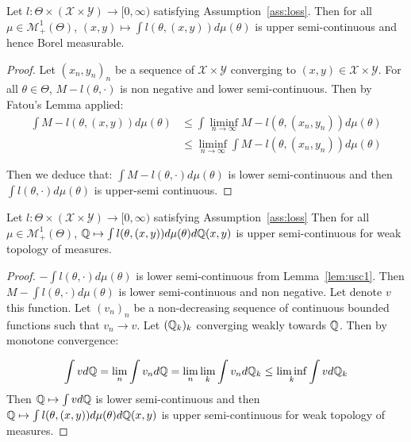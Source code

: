 \begin{lemma}
\label{lem:usc1}
Let $l:\Theta\times(\mathcal{X}\times\mathcal{Y})\rightarrow [0,\infty)$ satisfying Assumption~\ref{ass:loss}.
Then for all $\mu\in\mathcal{M}^1_+(\Theta)$, $(x,y)\mapsto\int l(\theta,(x,y))d\mu(\theta)$ is upper semi-continuous and hence Borel measurable.  
\end{lemma}
\begin{proof}
Let $(x_n,y_n)_n$ be a sequence of $\mathcal{X}\times\mathcal{Y}$ converging to $(x,y)\in\mathcal{X}\times\mathcal{Y}$.  For all $\theta\in\Theta$, $M-l(\theta,\cdot)$ is non negative and lower semi-continuous. Then by Fatou's Lemma applied:
\begin{align*}
   \int M-l(\theta,(x,y))d\mu(\theta)&\leq\int \liminf_{n\to\infty}  M-l(\theta,(x_n,y_n))d\mu(\theta)\\
   &\leq  \liminf_{n\to\infty}  \int M-l(\theta,(x_n,y_n))d\mu(\theta) 
\end{align*}

Then we deduce that: $\int M- l(\theta,\cdot)d\mu(\theta)$ is lower semi-continuous and then $\int l(\theta,\cdot)d\mu(\theta)$ is upper-semi continuous.
\end{proof}


\begin{lemma}
\label{lem:usc2}

Let $l:\Theta\times(\mathcal{X}\times\mathcal{Y})\rightarrow [0,\infty)$ satisfying Assumption~\ref{ass:loss}
Then for all $\mu\in\mathcal{M}^1_+(\Theta)$, $\mathbb{Q}\mapsto\int l(\theta,(x,y))d\mu(\theta)d\mathbb{Q}(x,y)$ is upper semi-continuous for weak topology of measures. 
\end{lemma}
\begin{proof}
 $-\int l(\theta,\cdot)d\mu(\theta) $ is lower semi-continuous from Lemma~\ref{lem:usc1}. Then $M-\int l(\theta,\cdot)d\mu(\theta) $ is lower semi-continuous and non negative. Let denote $v$ this function. Let $(v_n)_n$ be a non-decreasing sequence of continuous bounded functions such that $v_n\to v$. Let $(\mathbb{Q}_k)_k$ converging weakly towards $\mathbb{Q}$. Then by monotone convergence:
 
 \begin{align*}
     \int vd\mathbb{Q} = \lim_n \int v_nd\mathbb{Q} =\lim_n \lim_k\int v_nd\mathbb{Q}_k\leq \liminf_k \int vd\mathbb{Q}_k
 \end{align*}
 Then $\mathbb{Q}\mapsto\int vd\mathbb{Q}$ is lower semi-continuous and then $\mathbb{Q}\mapsto\int l(\theta,(x,y))d\mu(\theta)d\mathbb{Q}(x,y)$ is upper semi-continuous for weak topology of measures. 
 \end{proof}




